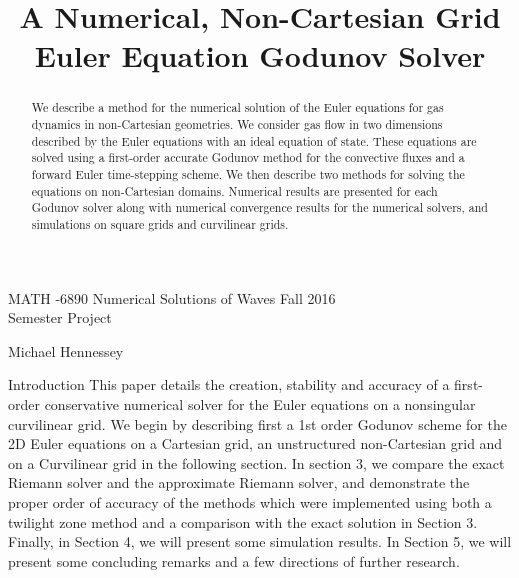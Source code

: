 

\begin{center}
\large{MATH -6890 \hspace{1in} Numerical Solutions of Waves \hspace{1in}Fall 2016\\
Semester Project}\end{center}
Michael Hennessey
\bigskip
\title{A Numerical, Non-Cartesian Grid Euler Equation Godunov Solver}

\begin{abstract}
We describe a method for the numerical solution of the Euler equations for gas dynamics in non-Cartesian geometries. We consider gas flow in two dimensions described by the Euler equations with an ideal equation of state. These equations are solved using a first-order accurate Godunov method for the convective fluxes and a forward Euler time-stepping scheme. We then describe two methods for solving the equations on non-Cartesian domains. Numerical results are presented for each Godunov solver along with numerical convergence results for the numerical solvers, and simulations on square grids and curvilinear grids.
\end{abstract}
\begin{section}{Introduction}
This paper details the creation, stability and accuracy of a first-order conservative numerical solver for the Euler equations on a nonsingular curvilinear grid. We begin by describing first a 1st order Godunov scheme for the 2D Euler equations on a Cartesian grid, an unstructured non-Cartesian grid and on a Curvilinear grid in the following section. In section 3, we compare the exact Riemann solver and the approximate Riemann solver, and demonstrate the proper order of accuracy of the methods which were implemented using both a twilight zone method and a comparison with the exact solution in Section 3. Finally, in Section 4, we will present some simulation results. In Section 5, we will present some concluding remarks and a few directions of further research.
\end{section}
